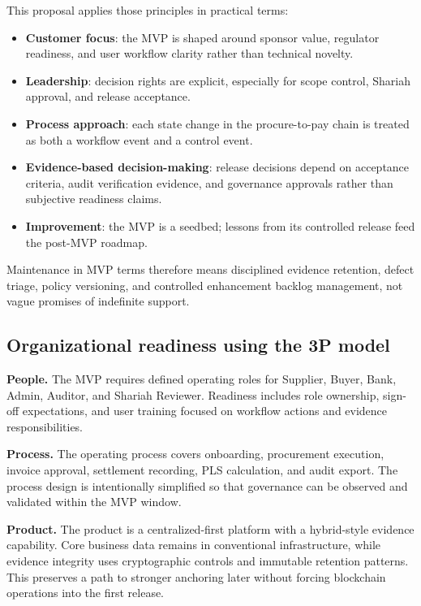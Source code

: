 \documentclass[11pt,a4paper]{article}
\begin{document}
This proposal applies those principles in practical terms:

\begin{itemize}
    \item \textbf{Customer focus}: the MVP is shaped around sponsor value, regulator readiness, and user workflow clarity rather than technical novelty.
    \item \textbf{Leadership}: decision rights are explicit, especially for scope control, Shariah approval, and release acceptance.
    \item \textbf{Process approach}: each state change in the procure-to-pay chain is treated as both a workflow event and a control event.
    \item \textbf{Evidence-based decision-making}: release decisions depend on acceptance criteria, audit verification evidence, and governance approvals rather than subjective readiness claims.
    \item \textbf{Improvement}: the MVP is a seedbed; lessons from its controlled release feed the post-MVP roadmap.
\end{itemize}

Maintenance in MVP terms therefore means disciplined evidence retention, defect triage, policy versioning, and controlled enhancement backlog management, not vague promises of indefinite support.

\subsection{Organizational readiness using the 3P model}

\textbf{People.} The MVP requires defined operating roles for Supplier, Buyer, Bank, Admin, Auditor, and Shariah Reviewer. Readiness includes role ownership, sign-off expectations, and user training focused on workflow actions and evidence responsibilities.

\textbf{Process.} The operating process covers onboarding, procurement execution, invoice approval, settlement recording, PLS calculation, and audit export. The process design is intentionally simplified so that governance can be observed and validated within the MVP window.

\textbf{Product.} The product is a centralized-first platform with a hybrid-style evidence capability. Core business data remains in conventional infrastructure, while evidence integrity uses cryptographic controls and immutable retention patterns. This preserves a path to stronger anchoring later without forcing blockchain operations into the first release.
\end{document}

